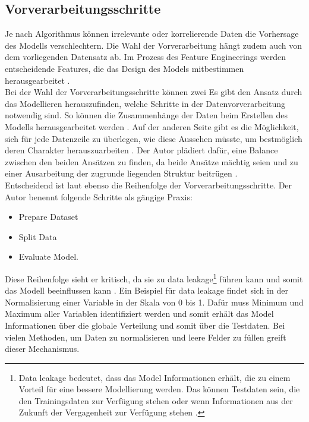 \documentclass[12pt]{report}
\begin{document}
	\subsection{Vorverarbeitungsschritte}
	Je nach Algorithmus können irrelevante oder korrelierende Daten die Vorhersage des Modells verschlechtern. Die Wahl der Vorverarbeitung hängt zudem auch von dem vorliegenden Datensatz ab. Im Prozess des Feature Engineerings werden entscheidende Features, die das Design des Models mitbestimmen herausgearbeitet \cite[12]{Brownlee.2020}.\\	
	Bei der Wahl der Vorverarbeitungsschritte können zwei Es gibt den Ansatz durch das Modellieren herauszufinden, welche Schritte in der Datenvorverarbeitung notwendig sind. So können die Zusammenhänge der Daten beim Erstellen des Modells herausgearbeitet werden \cite[13]{Brownlee.2020}. Auf der anderen Seite gibt es die Möglichkeit, sich für jede Datenzeile zu überlegen, wie diese Aussehen müsste, um bestmöglich deren Charakter herauszuarbeiten \cite[13]{Brownlee.2020}. Der Autor plädiert dafür, eine Balance zwischen den beiden Ansätzen zu finden, da beide Ansätze mächtig seien und zu einer Ausarbeitung der zugrunde liegenden Struktur beitrügen \cite[13]{Brownlee.2020}.\\
	Entscheidend ist laut \cite[25ff.]{Brownlee.2020} ebenso die Reihenfolge der Vorverarbeitungsschritte. Der Autor benennt folgende Schritte als gängige Praxis: 
	\begin{itemize} \itemsep0pt
		\item Prepare Dataset
		\item Split Data
		\item Evaluate Model.
	\end{itemize}
	Diese Reihenfolge sieht er kritisch, da sie zu data leakage\footnote{Data leakage bedeutet, dass das Model Informationen erhält, die zu einem Vorteil für eine bessere Modellierung werden. Das können Testdaten sein, die den Trainingsdaten zur Verfügung stehen oder wenn Informationen aus der Zukunft der Vergagenheit zur Verfügung stehen \cite[93]{Zheng.2018}.} führen kann und somit das Modell beeinflussen kann \cite[26]{Brownlee.2020}. Ein Beispiel für data leakage findet sich in der Normalisierung einer Variable in der Skala von 0 bis 1. Dafür muss Minimum und Maximum aller Variablen identifiziert werden und somit erhält das Model Informationen über die globale Verteilung und somit über die Testdaten. Bei vielen Methoden, um Daten zu normalisieren und leere Felder zu füllen greift dieser Mechanismus.\\
\end{document}

